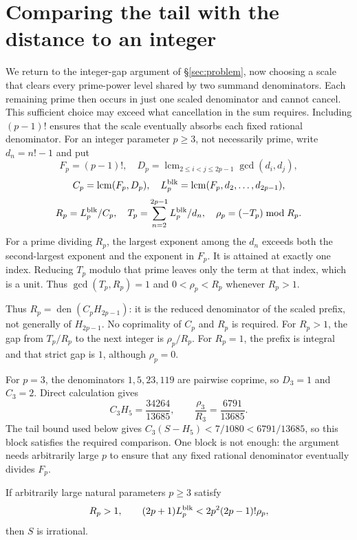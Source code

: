 \documentclass[11pt]{article}
\begin{document}
\section{Comparing the tail with the distance to an integer}\label{sec:projection}

We return to the integer-gap argument of \S\ref{sec:problem}, now choosing
a scale that clears every prime-power level shared by two summand
denominators. Each remaining prime then occurs in just one scaled
denominator and cannot cancel. This sufficient choice may exceed what
cancellation in the sum requires. Including $(p-1)!$ ensures that the
scale eventually absorbs each fixed rational denominator.
For an integer parameter $p\ge3$, not necessarily prime, write $d_n=n!-1$
and put
\[
F_p=(p-1)!,\quad
D_p=\operatorname{lcm}_{2\le i<j\le2p-1}\gcd(d_i,d_j),
\]
\[
C_p=\operatorname{lcm}(F_p,D_p),\quad
L_p^{\rm blk}=\operatorname{lcm}(F_p,d_2,\ldots,d_{2p-1}),
\]
\[
R_p=L_p^{\rm blk}/C_p,\quad
T_p=\sum_{n=2}^{2p-1}L_p^{\rm blk}/d_n,\quad
\rho_p=(-T_p)\bmod R_p.
\]
For a prime dividing $R_p$, the largest exponent among the $d_n$ exceeds
both the second-largest exponent and the exponent in $F_p$. It is attained
at exactly one index. Reducing $T_p$ modulo that prime leaves only the
term at that index, which is a unit. Thus $\gcd(T_p,R_p)=1$ and
$0<\rho_p<R_p$ whenever $R_p>1$.

Thus $R_p=\operatorname{den}(C_pH_{2p-1})$: it is the reduced denominator
of the scaled prefix, not generally of $H_{2p-1}$. No coprimality of $C_p$
and $R_p$ is required. For $R_p>1$, the gap from $T_p/R_p$ to the next
integer is $\rho_p/R_p$. For $R_p=1$, the prefix is integral and that
strict gap is $1$, although $\rho_p=0$.

For $p=3$, the denominators $1,5,23,119$ are pairwise coprime, so $D_3=1$
and $C_3=2$. Direct calculation gives
\[
C_3H_5=\frac{34264}{13685},\qquad
\frac{\rho_3}{R_3}=\frac{6791}{13685}.
\]
The tail bound used below gives
$C_3(S-H_5)<7/1080<6791/13685$, so this block satisfies the required
comparison. One block is not enough: the argument needs arbitrarily large
$p$ to ensure that any fixed rational denominator eventually divides $F_p$.

\begin{proposition}
\label{res:global-complementary-criterion}
If arbitrarily large natural parameters $p\ge3$ satisfy
\begin{equation}
R_p>1,\qquad
(2p+1)L_p^{\rm blk}<2p^2(2p-1)!\rho_p,
\label{eq:global-complementary-target}
\end{equation}
then $S$ is irrational.
\end{proposition}
\end{document}
